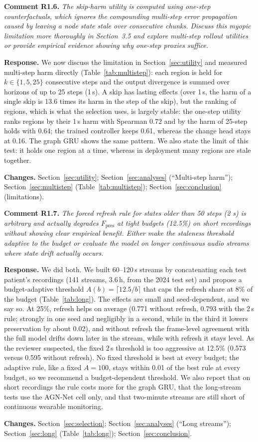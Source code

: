 \documentclass[11pt]{article}
\newcommand{\rc}[2]{\par\medskip\noindent\colorbox{black!6}{\parbox{\dimexpr\linewidth-2\fboxsep}{\textbf{Comment #1.} \itshape #2}}\par}
\newcommand{\resp}{\par\noindent\textbf{Response.} }
\newcommand{\chg}{\par\noindent\textbf{Changes.} }
\begin{document}
\rc{R1.6}{The skip-harm utility is computed using one-step counterfactuals, which ignores the compounding multi-step error propagation caused by leaving a node state stale over consecutive chunks. Discuss this myopic limitation more thoroughly in Section~3.5 and explore multi-step rollout utilities or provide empirical evidence showing why one-step proxies suffice.}
\resp We now discuss the limitation in Section~\ref{sec:utility} and measured multi-step harm directly (Table~\ref{tab:multistep}): each region is held for $k\in\{1,5,25\}$ consecutive steps and the output divergence is summed over horizons of up to 25 steps (1\,s). A skip has lasting effects (over 1\,s, the harm of a single skip is 13.6 times its harm in the step of the skip), but the ranking of regions, which is what the selection uses, is largely stable: the one-step utility ranks regions by their 1\,s harm with Spearman 0.72 and by the harm of 25-step holds with 0.64; the trained controller keeps 0.61, whereas the change head stays at 0.16. The graph GRU shows the same pattern. We also state the limit of this test: it holds one region at a time, whereas in deployment many regions are stale together.
\chg Section~\ref{sec:utility}; Section~\ref{sec:analyses} (``Multi-step harm''); Section~\ref{sec:multistep} (Table~\ref{tab:multistep}); Section~\ref{sec:conclusion} (limitations).

\rc{R1.7}{The forced refresh rule for states older than 50 steps (2 s) is arbitrary and actually degrades $F_{\mathrm{pres}}$ at tight budgets (12.5\%) on short recordings without showing clear empirical benefit. Either make the staleness threshold adaptive to the budget or evaluate the model on longer continuous audio streams where state drift actually occurs.}
\resp We did both. We built 60--120\,s streams by concatenating each test patient's recordings (141 streams, 3.6\,h, from the 2024 test set) and propose a budget-adaptive threshold $A(b)=\lceil 12.5/b\rceil$ that caps the refresh share at 8\% of the budget (Table~\ref{tab:long}). The effects are small and seed-dependent, and we say so. At 25\%, refresh helps on average (0.771 without refresh, 0.793 with the 2\,s rule; strongly in one seed and negligibly in a second, while in the third it lowers preservation by about 0.02), and without refresh the frame-level agreement with the full model drifts down later in the stream, while with refresh it stays level. As the reviewer suspected, the fixed 2\,s threshold is too aggressive at 12.5\% (0.573 versus 0.595 without refresh). No fixed threshold is best at every budget; the adaptive rule, like a fixed $A{=}100$, stays within 0.01 of the best rule at every budget, so we recommend a budget-dependent threshold. We also report that on short recordings the rule costs more for the graph GRU, that the long-stream tests use the AGN-Net cell only, and that two-minute streams are still short of continuous wearable monitoring.
\chg Section~\ref{sec:selection}; Section~\ref{sec:analyses} (``Long streams''); Section~\ref{sec:long} (Table~\ref{tab:long}); Section~\ref{sec:conclusion}.
\end{document}
